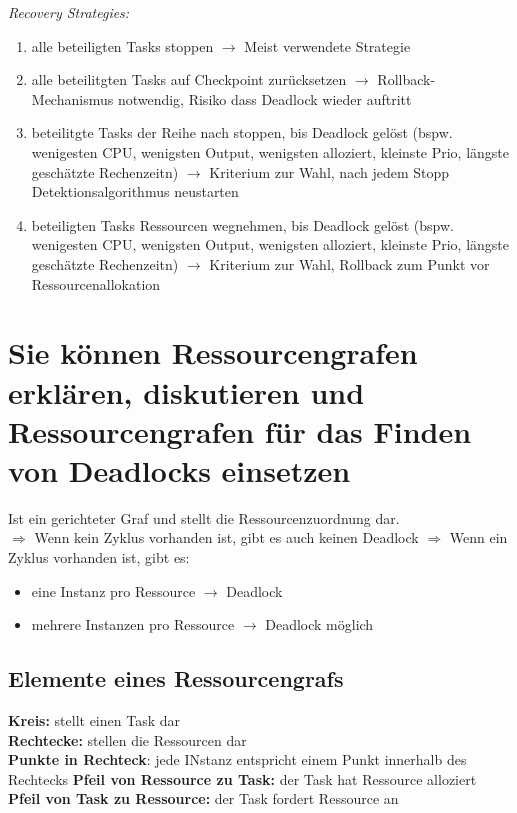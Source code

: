 \documentclass{report}
\theoremstyle{definition}
\theoremstyle{example}
\begin{document}
\textit{Recovery Strategies:}\\
\begin{enumerate}
	\item alle beteiligten Tasks stoppen $\rightarrow$ Meist verwendete Strategie
	\item alle beteilitgten Tasks auf Checkpoint zurücksetzen $\rightarrow$ Rollback-Mechanismus notwendig, Risiko dass Deadlock wieder auftritt
	\item beteilitgte Tasks der Reihe nach stoppen, bis Deadlock gelöst (bspw. wenigesten CPU, wenigsten Output, wenigsten alloziert, kleinste Prio, längste geschätzte Rechenzeitn) $\rightarrow$ Kriterium zur Wahl, nach jedem Stopp Detektionsalgorithmus neustarten
	\item beteiligten Tasks Ressourcen wegnehmen, bis Deadlock gelöst (bspw. wenigesten CPU, wenigsten Output, wenigsten alloziert, kleinste Prio, längste geschätzte Rechenzeitn) $\rightarrow$ Kriterium zur Wahl, Rollback zum Punkt vor Ressourcenallokation
\end{enumerate}

\section{Sie können Ressourcengrafen erklären, diskutieren und Ressourcengrafen für das Finden von Deadlocks einsetzen}
Ist ein gerichteter Graf und stellt die Ressourcenzuordnung dar.\\
$\Rightarrow$ Wenn kein Zyklus vorhanden ist, gibt es auch keinen Deadlock
$\Rightarrow$ Wenn ein Zyklus vorhanden ist, gibt es:
\begin{itemize}
	\item eine Instanz pro Ressource $\rightarrow$ Deadlock
	\item mehrere Instanzen pro Ressource $\rightarrow$ Deadlock möglich
\end{itemize}
	\subsection{Elemente eines Ressourcengrafs}
\textbf{Kreis:} stellt einen Task dar\\
\textbf{Rechtecke:} stellen die Ressourcen dar\\
\textbf{Punkte in Rechteck}: jede INstanz entspricht einem Punkt innerhalb des Rechtecks
\textbf{Pfeil von Ressource zu Task:} der Task hat Ressource alloziert\\
\textbf{Pfeil von Task zu Ressource:} der Task fordert Ressource an\\
\end{document}
